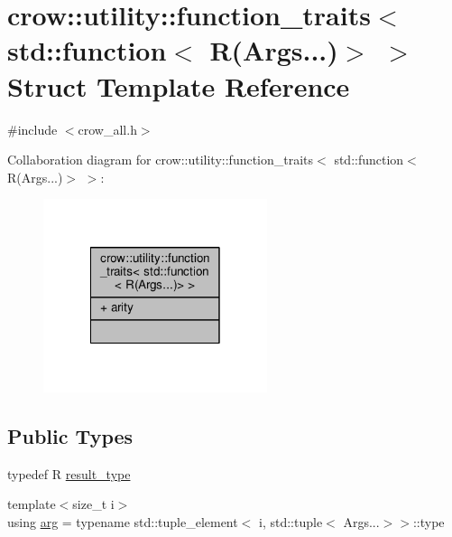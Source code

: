 \hypertarget{structcrow_1_1utility_1_1function__traits_3_01std_1_1function_3_01_r_07_args_8_8_8_08_4_01_4}{\section{crow\-:\-:utility\-:\-:function\-\_\-traits$<$ std\-:\-:function$<$ R(Args...)$>$ $>$ Struct Template Reference}
\label{structcrow_1_1utility_1_1function__traits_3_01std_1_1function_3_01_r_07_args_8_8_8_08_4_01_4}
}


{\ttfamily \#include $<$crow\-\_\-all.\-h$>$}



Collaboration diagram for crow\-:\-:utility\-:\-:function\-\_\-traits$<$ std\-:\-:function$<$ R(Args...)$>$ $>$\-:
\nopagebreak
\begin{figure}[H]
\begin{center}
\leavevmode
\includegraphics[width=186pt]{structcrow_1_1utility_1_1function__traits_3_01std_1_1function_3_01_r_07_args_8_8_8_08_4_01_4__coll__graph}
\end{center}
\end{figure}
\subsection*{Public Types}
\begin{DoxyCompactItemize}
\item 
typedef R \hyperlink{structcrow_1_1utility_1_1function__traits_3_01std_1_1function_3_01_r_07_args_8_8_8_08_4_01_4_a196a60dc8ea498d8e4c09c41df524f09}{result\-\_\-type}
\item 
{\footnotesize template$<$size\-\_\-t i$>$ }\\using \hyperlink{structcrow_1_1utility_1_1function__traits_3_01std_1_1function_3_01_r_07_args_8_8_8_08_4_01_4_a880b9ad766c1a3c6999e60f0fca9f940}{arg} = typename std\-::tuple\-\_\-element$<$ i, std\-::tuple$<$ Args...$>$$>$\-::type
\end{DoxyCompactItemize}
